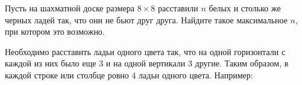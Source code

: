 
Пусть на шахматной доске размера $8 \times 8$  расставили $n$ белых и столько же черных ладей так, что они не бьют друг друга. Найдите такое максимальное $n$, при котором это возможно.

\solutionSection

Необходимо расставить ладьи одного цвета так, что на одной горизонтали с каждой из них было еще 3 и на одной вертикали 3 другие. Таким образом, в каждой строке или столбце ровно 4 ладьи одного цвета. Например:

\newgame
{}
\showboard

